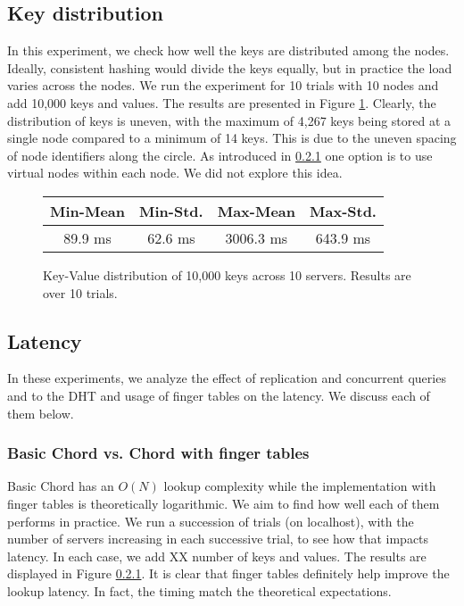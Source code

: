 \documentclass{sig-alternate-10pt}
\begin{document}
\subsection{Key distribution}
In this experiment, we check how well the keys are distributed among the nodes. Ideally, consistent hashing would divide the keys equally, but in practice the load varies across the nodes. We run the experiment for 10 trials with 10 nodes and add 10,000 keys and values. The results are presented in Figure \ref{fig:keydist}. Clearly, the distribution of keys is uneven, with the maximum of 4,267 keys being stored at a single node compared to a minimum of 14 keys. This is due to the uneven spacing of node identifiers along the circle.  As introduced in \ref{} one option is to use virtual nodes within each node.  We did not explore this idea.


\begin{figure}[hb]
  \centering
\begin{tabular}{ c | c | c | c }
  Min-Mean & Min-Std. & Max-Mean & Max-Std. \\
  \hline
  89.9 ms & 62.6 ms & 3006.3 ms & 643.9 ms \\
\end{tabular}
  \caption{Key-Value distribution of 10,000 keys across 10 servers.  Results are over 10 trials.}
  \label{fig:keydist}
\end{figure}


\subsection{Latency}
In these experiments, we analyze the effect of replication and concurrent queries and to the DHT and usage of finger tables on the latency. We discuss each of them below.
\subsubsection{Basic Chord vs. Chord with finger tables}
Basic Chord has an $O(N)$ lookup complexity while the implementation with finger tables is theoretically logarithmic. We aim to find how well each of them performs in practice. We run a succession of trials (on localhost), with the number of servers increasing in each successive trial, to see how that impacts latency. In each case, we add XX number of keys and values. The results are displayed in Figure \ref{}. It is clear that finger tables definitely help improve the lookup latency. In fact, the timing match the theoretical expectations.
\end{document}
